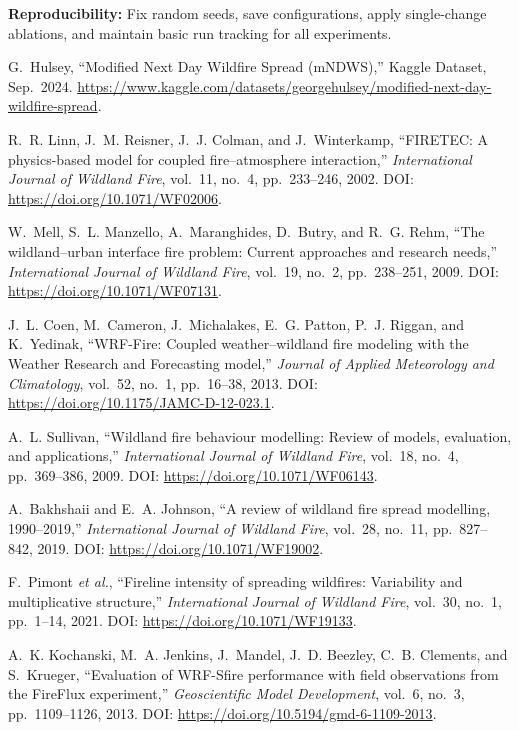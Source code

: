\documentclass[conference]{IEEEtran}
\begin{document}
\noindent\textbf{Reproducibility:} Fix random seeds, save configurations, apply single-change ablations, and maintain basic run tracking for all experiments.

\begin{thebibliography}{00}

G.~Hulsey, ``Modified Next Day Wildfire Spread (mNDWS),'' Kaggle Dataset, Sep.~2024. \url{https://www.kaggle.com/datasets/georgehulsey/modified-next-day-wildfire-spread}.

R.~R. Linn, J.~M. Reisner, J.~J. Colman, and J.~Winterkamp,
``FIRETEC: A physics-based model for coupled fire--atmosphere interaction,''
\emph{International Journal of Wildland Fire}, vol.~11, no.~4, pp.~233--246, 2002. DOI: \url{https://doi.org/10.1071/WF02006}.

W.~Mell, S.~L. Manzello, A.~Maranghides, D.~Butry, and R.~G. Rehm,
``The wildland--urban interface fire problem: Current approaches and research needs,''
\emph{International Journal of Wildland Fire}, vol.~19, no.~2, pp.~238--251, 2009. DOI: \url{https://doi.org/10.1071/WF07131}.

J.~L. Coen, M.~Cameron, J.~Michalakes, E.~G. Patton, P.~J. Riggan, and K.~Yedinak,
``WRF-Fire: Coupled weather--wildland fire modeling with the Weather Research and Forecasting model,''
\emph{Journal of Applied Meteorology and Climatology}, vol.~52, no.~1, pp.~16--38, 2013. DOI: \url{https://doi.org/10.1175/JAMC-D-12-023.1}.

A.~L. Sullivan,
``Wildland fire behaviour modelling: Review of models, evaluation, and applications,''
\emph{International Journal of Wildland Fire}, vol.~18, no.~4, pp.~369--386, 2009. DOI: \url{https://doi.org/10.1071/WF06143}.

A.~Bakhshaii and E.~A. Johnson,
``A review of wildland fire spread modelling, 1990--2019,''
\emph{International Journal of Wildland Fire}, vol.~28, no.~11, pp.~827--842, 2019. DOI: \url{https://doi.org/10.1071/WF19002}.

F.~Pimont \emph{et al.},
``Fireline intensity of spreading wildfires: Variability and multiplicative structure,''
\emph{International Journal of Wildland Fire}, vol.~30, no.~1, pp.~1--14, 2021. DOI: \url{https://doi.org/10.1071/WF19133}.

A.~K. Kochanski, M.~A. Jenkins, J.~Mandel, J.~D. Beezley, C.~B. Clements, and S.~Krueger,
``Evaluation of WRF-Sfire performance with field observations from the FireFlux experiment,''
\emph{Geoscientific Model Development}, vol.~6, no.~3, pp.~1109--1126, 2013. DOI: \url{https://doi.org/10.5194/gmd-6-1109-2013}.


\end{thebibliography}
\end{document}
